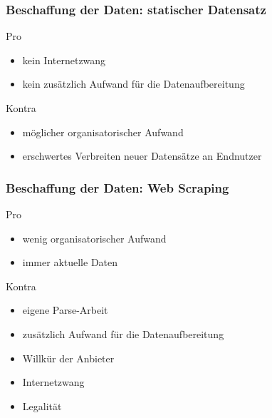 \documentclass{beamer}
\begin{document}
    \begin{frame}
        \frametitle{Beschaffung der Daten: statischer Datensatz}
        \begin{exampleblock}{Pro}
            \begin{itemize}
                \item kein Internetzwang
                \item kein zusätzlich Aufwand für die Datenaufbereitung
            \end{itemize}
        \end{exampleblock}
        \begin{alertblock}{Kontra}
            \begin{itemize}
                \item möglicher organisatorischer Aufwand
                \item erschwertes Verbreiten neuer Datensätze an Endnutzer
            \end{itemize}
        \end{alertblock}
    \end{frame}
    \begin{frame}
        \frametitle{Beschaffung der Daten: Web Scraping}
        \begin{exampleblock}{Pro}
            \begin{itemize}
                \item wenig organisatorischer Aufwand
                \item immer aktuelle Daten
            \end{itemize}
        \end{exampleblock}
        \begin{alertblock}{Kontra}
            \begin{itemize}
                \item eigene Parse-Arbeit
                \item zusätzlich Aufwand für die Datenaufbereitung
                \item Willkür der Anbieter
                \item Internetzwang
                \item Legalität
            \end{itemize}
        \end{alertblock}
    \end{frame}
\end{document}
